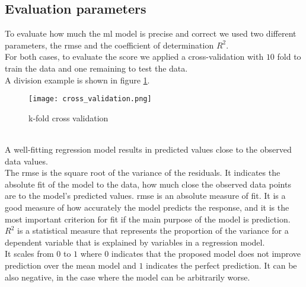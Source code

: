 \subsection{Evaluation parameters}
To evaluate how much the \gls{ml} model is precise and correct we used two different parameters, the \gls{rmse} and the coefficient of determination $R^2$.
\\ \indent
For both cases, to evaluate the score we applied a cross-validation with $10$ fold to train the data and one remaining to test the data.
\\
A division example is shown in figure \ref{fig:cross_validation}.
\begin{figure}[h]
    \centering
    \texttt{[image: cross\_validation.png]} 
	\caption{k-fold cross validation}
    \label{fig:cross_validation}
\end{figure} 
\\
A well-fitting regression model results in predicted values close to the observed data values.
\\
The \gls{rmse} is the square root of the variance of the residuals. It indicates the absolute fit of the model to the data, how much close the observed data points are to the model's predicted values. \gls{rmse} is an absolute measure of fit. It is a good measure of how accurately the model predicts the response, and it is the most important criterion for fit if the main purpose of the model is prediction.
\\ \indent
$R^2$ is a statistical measure that represents the proportion of the variance for a dependent variable that is explained by variables in a regression model.
\\
It scales from $0$ to $1$ where $0$ indicates that the proposed model does not improve prediction over the mean model and $1$ indicates the perfect prediction. It can be also negative, in the case where the model can be arbitrarily worse.